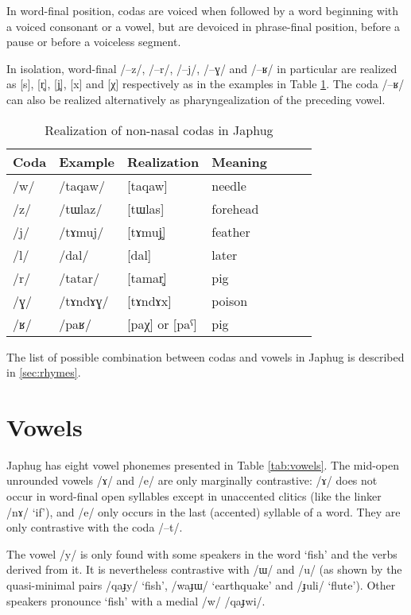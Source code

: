 \documentclass[oldfontcommands,oneside,a4paper,11pt]{article}
\newcommand{\ipa}[1]{/#1/} %
\begin{document}
In word-final position, codas are voiced when followed by a word beginning with a voiced consonant or a vowel, but are devoiced in phrase-final position, before a pause or before a voiceless segment.

In isolation, word-final \ipa{--z}, \ipa{--r}, \ipa{--j}, \ipa{--ɣ} and \ipa{--ʁ} in particular are realized as [s], [r̥], [j̥], [x] and [χ] respectively as in the examples in Table \ref{tab:codas}. The coda \ipa{--ʁ} can also be realized alternatively as pharyngealization of the preceding vowel.

\begin{table}
 \caption{Realization of non-nasal  codas in Japhug} \label{tab:codas}  \centering
\begin{tabular}{lllllll}
\toprule
Coda & Example & Realization &Meaning\\
\midrule
\ipa{w} & \ipa{taqaw} &[taqaw] &needle\\
\ipa{z} & \ipa{tɯlaz} &[tɯlas] &forehead\\
\ipa{j} & \ipa{tɤmuj} &[tɤmuj̥] &feather\\
\ipa{l} & \ipa{dal} &[dal] &later\\
\ipa{r} & \ipa{tatar} &[tamar̥] &pig\\
\ipa{ɣ} & \ipa{tɤndɤɣ} &[tɤndɤx] &poison\\
\ipa{ʁ} & \ipa{paʁ} & [paχ] or [paˁ] &pig\\
\bottomrule
\end{tabular}
\end{table}
    
    
    The list of possible combination between codas and vowels in Japhug is described in \ref{sec:rhymes}.
    
     \section{Vowels} \label{sec:vowels}
     
     
     Japhug has eight vowel phonemes presented in Table \ref{tab:vowels}. The mid-open unrounded vowels \ipa{ɤ} and \ipa{e} are only marginally contrastive: \ipa{ɤ} does not occur in word-final open syllables except in unaccented clitics (like the linker \ipa{nɤ} `if'), and \ipa{e} only occurs in the last (accented) syllable of a word. They are only contrastive with the coda \ipa{--t}.
     
The vowel \ipa{y} is only found with some speakers in the word `fish' and the verbs derived from it. It is nevertheless contrastive with \ipa{ɯ} and \ipa{u} (as shown by the quasi-minimal pairs \ipa{qaɟy} `fish', \ipa{waɟɯ} `earthquake' and \ipa{ɟuli} `flute'). Other speakers pronounce `fish' with a medial \ipa{w} \ipa{qaɟwi}.
     
\end{document}
